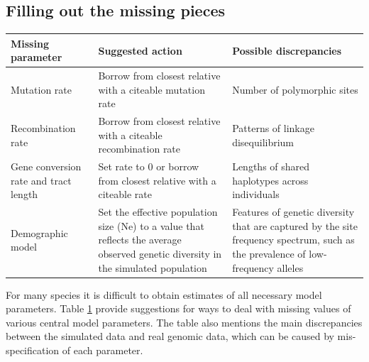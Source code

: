\documentclass[hidelinks]{article}
\begin{document}
\subsection*{Filling out the missing pieces}

\begin{table}[b!]
	 \label{tab:param-mod}
	\begin{tabular}{p{1.5in}p{2.2in}p{2.2in}}
		\hline
		\textbf{Missing parameter}  & 
		\textbf{Suggested action} & 
		\textbf{Possible discrepancies} \\
		\hline
		Mutation rate      &
		Borrow from closest relative with a citeable mutation rate &
		Number of polymorphic sites  \\
		\hline
		Recombination rate &
		Borrow from closest relative with a citeable recombination rate &
		Patterns of linkage disequilibrium
		\\
		\hline
		Gene conversion rate and tract length &
		Set rate to 0 or borrow from closest relative with a citeable rate &
		Lengths of shared haplotypes across individuals
		\\
		\hline
		Demographic model &
		Set the effective population size (Ne) to a value
		that reflects the average observed genetic diversity in the
		simulated population
		     &
		Features of genetic diversity that are captured by the site frequency spectrum,
		such as the prevalence of low-frequency alleles\\
		\hline
	\end{tabular}
\end{table}

For many species it is difficult to obtain estimates of all necessary model parameters.
Table \ref{tab:param-mod} provide suggestions for ways to deal with missing values of various central model parameters.
The table also mentions the main discrepancies between the simulated data and real genomic data,
which can be caused by mis-specification of each parameter.
\end{document}
